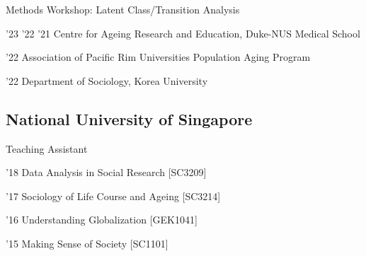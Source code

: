 \begin{aka}[noitemsep]
    \item [2021--2023] Methods Workshop: Latent Class/Transition Analysis
    \begin{akb}
    \item '23 '22 '21 Centre for Ageing Research and Education, Duke-NUS Medical School
    \item '22 Association of Pacific Rim Universities Population Aging Program
    \item '22 Department of Sociology, Korea University
    \end{akb}

\end{aka}



\subsection{National University of Singapore}

\begin{aka}[noitemsep]
    \item [2015--2018] Teaching Assistant
    \begin{akb}
    \item '18 Data Analysis in Social Research [SC3209]
    \item '17 Sociology of Life Course and Ageing [SC3214]
    \item '16 Understanding Globalization [GEK1041]
    \item '15 Making Sense of Society [SC1101]
    \end{akb}
\end{aka}
